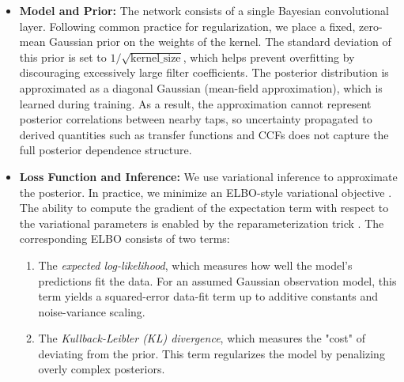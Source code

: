 \documentclass[preprint,1p,times,authoryear]{elsarticle}
\begin{document}
\begin{itemize}
    \item \textbf{Model and Prior:} The network consists of a single Bayesian convolutional layer. Following common practice for regularization, we place a fixed, zero-mean Gaussian prior on the weights of the kernel. The standard deviation of this prior is set to $1/\sqrt{\text{kernel\_size}}$, which helps prevent overfitting by discouraging excessively large filter coefficients. The posterior distribution is approximated as a diagonal Gaussian (mean-field approximation), which is learned during training. As a result, the approximation cannot represent posterior correlations between nearby taps, so uncertainty propagated to derived quantities such as transfer functions and CCFs does not capture the full posterior dependence structure.

    \item \textbf{Loss Function and Inference:} We use variational inference to approximate the posterior. In practice, we minimize an ELBO-style variational objective \citep{TFPConvolution1DFlipoutDocs}. The ability to compute the gradient of the expectation term with respect to the variational parameters is enabled by the reparameterization trick \citep{Kingma2013, Rezende2014}. The corresponding ELBO consists of two terms:
    \begin{enumerate}
        \item The \textit{expected log-likelihood}, which measures how well the model's predictions fit the data. For an assumed Gaussian observation model, this term yields a squared-error data-fit term up to additive constants and noise-variance scaling.
        \item The \textit{Kullback-Leibler (KL) divergence}, which measures the "cost" of deviating from the prior. This term regularizes the model by penalizing overly complex posteriors.
    \end{enumerate}
    

\end{itemize}
\end{document}

